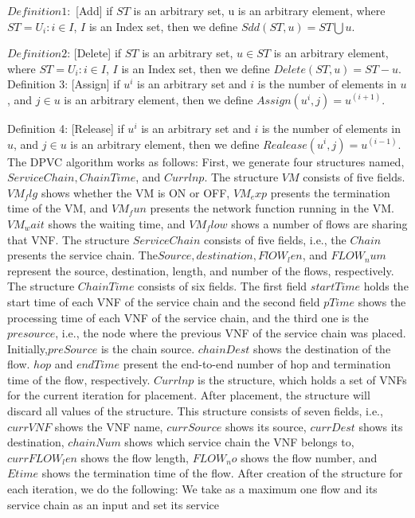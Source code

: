 \documentclass[12pt]{article}
\begin{document}
$Definition 1:$ [Add] if $ST$ is an arbitrary set, u is an
arbitrary element, where $ST = {U_i:i \in I}$, $I$  is an Index set,
then we define $Sdd(ST,u)=ST  \bigcup {u} $.

$Definition 2$: [Delete] if $ST$ is an arbitrary set, $u \in ST$ is an
arbitrary element, where $ST={U_i:i \in I}$, $I$ is an Index set,
then we define $Delete (ST,u)=ST-{u}$.
Definition 3: [Assign] if $u^i$ is an arbitrary set and $i$ is the
number of elements in $u$, and $j \in u$ is an arbitrary element,
then we define $Assign (u^i,j)=u^(i+1)$.

Definition 4: [Release] if $u^i$ is an arbitrary set and $i$ is the
number of elements in $u$, and $j \in u$ is an arbitrary element,
then we define $Realease (u^i,j)=u^(i-1)$.
The DPVC algorithm works as follows: First, we generate
four structures named, $ServiceChain,ChainTime$, and
$Currlnp$. The structure $VM$ consists of five fields. $VM_flg$
shows whether the VM is ON or OFF, $VM_exp$ presents the
termination time of the VM, and $VM_fun$ presents the network
function running in the VM. $VM_wait$ shows the waiting time,
and 
 $VM_flow$ shows a number of flows are sharing that VNF.
The structure $ServiceChain$ consists of five fields, i.e., the
$Chain$ presents the service chain. The$Source,destination,FlOW_len$, and $FLOW_num$ represent the source, destination,
length, and number of the flows, respectively. The structure
$ChainTime$ consists of six fields. The first field $startTime$
holds the start time of each VNF of the service chain and the
second field $pTime$ shows the processing time of each VNF
of the service chain, and the third one is the $presource$, i.e.,
the node where the previous VNF of the service chain was
placed. Initially,$preSource$ is the chain source. $chainDest$
shows the destination of the flow. $hop$ and $endTime$ present
the end-to-end number of hop and termination time of the
flow, respectively. $Currlnp$ is  the structure, which holds a set
of VNFs for the current iteration for placement. After
placement, the structure will discard all values of the structure.
This structure consists of seven fields, i.e., $currVNF$ shows
the VNF name, $currSource$ shows its source, $currDest$
shows its destination, $chainNum$ shows which service chain
the VNF belongs to, $currFLOW_len$ shows the flow length,
$FLOW_no$ shows the flow number, and $Etime$ shows the
termination time of the flow. After creation of the structure for
each iteration, we do the following: We take as a maximum
one flow and its service chain as an input and set its service
\end{document}
